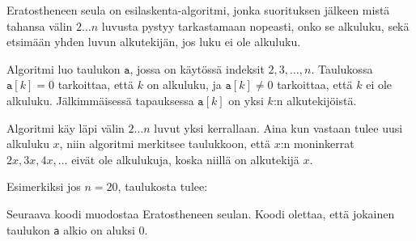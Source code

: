 
Eratostheneen seula on esilaskenta-algoritmi,
jonka suorituksen jälkeen mistä tahansa
välin $2 \ldots n$ luvusta pystyy tarkastamaan
nopeasti, onko se alkuluku,
sekä etsimään yhden luvun alkutekijän,
jos luku ei ole alkuluku.

Algoritmi luo taulukon $\texttt{a}$,
jossa on käytössä indeksit $2,3,\ldots,n$.
Taulukossa $\texttt{a}[k]=0$ tarkoittaa,
että $k$ on alkuluku,
ja $\texttt{a}[k] \neq 0$ tarkoittaa,
että $k$ ei ole alkuluku.
Jälkimmäisessä tapauksessa $\texttt{a}[k]$
on yksi $k$:n alkutekijöistä.

Algoritmi käy läpi välin
$2 \ldots n$ luvut yksi kerrallaan.
Aina kun vastaan tulee uusi alkuluku $x$,
niin algoritmi merkitsee taulukkoon, että $x$:n moninkerrat
$2x,3x,4x,\ldots$ eivät ole alkulukuja,
koska niillä on alkutekijä $x$.

Esimerkiksi jos $n=20$,
taulukosta tulee:

\begin{center}
\end{center}

\noindent
Seuraava koodi muodostaa
Eratostheneen seulan.
Koodi olettaa, että jokainen taulukon \texttt{a}
alkio on aluksi 0.

